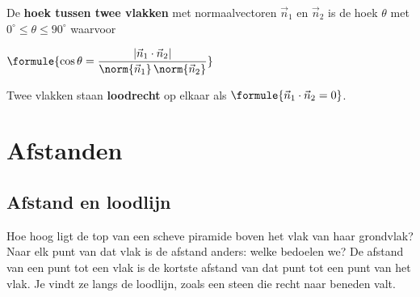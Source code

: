 \begin{theorie}
De \textbf{\textcolor{accent}{hoek tussen twee vlakken}} met normaalvectoren $\vec n_1$ en $\vec n_2$ is de hoek $\theta$ met $0^\circ \leqslant \theta \leqslant 90^\circ$ waarvoor

\qquad $\formule{\cos\theta = \dfrac{|\vec n_1 \cdot \vec n_2|}{\norm{\vec n_1}\,\norm{\vec n_2}}}$

Twee vlakken staan \textbf{\textcolor{accent}{loodrecht}} op elkaar als $\formule{\vec n_1 \cdot \vec n_2 = 0}$.
\end{theorie}



\begin{oefeningen}
\end{oefeningen}

\section{Afstanden}

\subsection{Afstand en loodlijn}

Hoe hoog ligt de top van een scheve piramide boven het vlak van haar grondvlak? Naar elk punt van dat vlak is de afstand anders: welke bedoelen we? De afstand van een punt tot een vlak is de kortste afstand van dat punt tot een punt van het vlak. Je vindt ze langs de loodlijn, zoals een steen die recht naar beneden valt.

